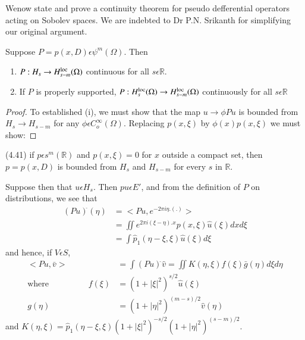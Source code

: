 We\pageoriginale now state and prove a continuity theorem for pseudo defferential
operators acting on Sobolev spaces. We are indebted to Dr
P.N. Srikanth for simplifying our original argument. 
\setcounter{thm}{39}
\begin{thm}\label{chap4:sec7:thm4.40}%
  Suppose $P=p(x,D)\epsilon \psi ^m (\Omega)$. Then
  \begin{enumerate}[\rm i)]
  \item $P: H_s \to H^{\operatorname{loc}}_{s-m}(\Omega)$ continuous for all
    $s \epsilon \mathbb{R}$. 
  \item If $P$ is properly supported, $P: H^{\operatorname{loc}}_s (\Omega) \to
    H^{\operatorname{loc}}_{s-m}(\Omega)$ continuously for all $s \epsilon
    \mathbb{R}$ 
  \end{enumerate}
\end{thm}

\begin{proof}
To established (i), we must show that the map $u \to \phi Pu$ is
bounded from $H_s \to H_{s-m}$ for any $\phi \epsilon C^\infty _o
(\Omega)$. Replacing $p (x, \xi)$ by $\phi (x)p (x, \xi)$ we must
show: 
\end{proof}

\noindent  (4.41)\qquad 
if $p \epsilon s^m (\mathbb{R})$ and $p(x, \xi)=0$ for $x$ outside
a compact set, then $p=p(x,D)$ is bounded from $H_s$ and $H_{s-m}$ for
every $s$ in $\mathbb{R}$. 

Suppose then that $u \epsilon H_s$. Then $pu \epsilon E'$, and
from the definition of $P$ on distributions, we see that 
\begin{align*}
  (Pu)^{\hat{}}(\eta) & = < Pu, e^{-2 \pi i \eta.(.)}>\\
  &=\iint e^{2 \pi i (\xi- \eta). x} p(x, \xi) \hat{u}(\xi ) dx d \xi\\
  &= \int \hat{p}_1 (\eta - \xi, \xi) \hat{u}(\xi)d \xi 
\end{align*}
and hence, if $V \epsilon S$, 
\begin{align*}
  <Pu, \bar{v}> & = \int (Pu)^{\hat{}}\hat{v}= \iint K(\eta,  \xi)f
  (\xi)\bar{g}(\eta) d \xi d \eta\\
  \text{where} \hspace{2cm} f(\xi) & = (1 +|\xi|^2)^{s/2} \hat{u}(\xi)\\
  g (\eta) &= (1 + |\eta|^2)^{(m-s)/2} \hat{v}(\eta)
\end{align*}
and $K(\eta, \xi) = \hat{p}_1 (\eta - \xi, \xi) (1+ |\xi|^2)^{-s/2}
(1+ | \eta|^2)^{(s-m)/2}$.\pageoriginale 

